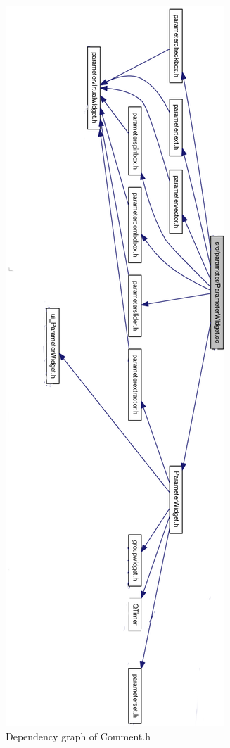 \begin{figure}
	\centering
	\includegraphics[width=0.7\linewidth,height=1.37\columnwidth]{images/dependene}
	\caption{ Dependency graph of Comment.h}
	\label{fig:dependency}
\end{figure}

